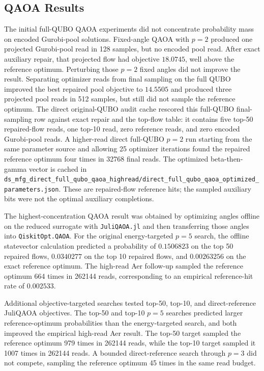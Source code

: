 \subsection{QAOA Results}
\label{subsec:ds-mfg-qaoa-results}

The initial full-QUBO QAOA experiments did not concentrate probability mass on
encoded Gurobi-pool solutions. Fixed-angle QAOA with $p=2$ produced one
projected Gurobi-pool read in 128 samples, but no encoded pool read. After
exact auxiliary repair, that projected flow had objective $18.0745$, well above
the reference optimum. Perturbing those $p=2$ fixed angles did not improve the
result. Separating optimizer reads from final sampling on the full QUBO improved
the best repaired pool objective to $14.5505$ and produced three projected pool
reads in 512 samples, but still did not sample the reference optimum.
The direct original-QUBO audit cache rescored this full-QUBO final-sampling row
against exact repair and the top-flow table: it contains five top-50
repaired-flow reads, one top-10 read, zero reference reads, and zero encoded
Gurobi-pool reads.
A higher-read direct full-QUBO $p=2$ run starting from the same parameter source
and allowing 25 optimizer iterations found the repaired reference optimum four
times in 32768 final reads. The optimized beta-then-gamma vector is cached in
\texttt{ds\_mfg\_direct\_full\_qubo\_qaoa\_highread/direct\_full\_qubo\_qaoa\_optimized\_parameters.json}.
These are repaired-flow reference hits; the sampled auxiliary bits were not the
optimal auxiliary completions.

The highest-concentration QAOA result was obtained by optimizing angles offline on the
reduced surrogate with \texttt{JuliQAOA.jl} and then transferring those angles
into \texttt{QiskitOpt.QAOA}. For the original energy-targeted $p=5$ search,
the offline statevector calculation
predicted a probability of $0.1506823$ on the top 50 repaired flows, $0.0340277$
on the top 10 repaired flows, and $0.00263256$ on the exact reference optimum. The
high-read Aer follow-up sampled the reference optimum 664 times in 262144 reads,
corresponding to an empirical reference-hit rate of $0.002533$.

Additional objective-targeted searches tested top-50, top-10, and direct-reference
JuliQAOA objectives. The top-50 and top-10 $p=5$ searches predicted larger
reference-optimum probabilities than the energy-targeted search, and both improved
the empirical high-read Aer result. The top-50 target sampled the reference optimum
979 times in 262144 reads, while the top-10 target sampled it 1007 times in
262144 reads. A bounded direct-reference search through $p=3$ did not compete,
sampling the reference optimum 45 times in the same read budget.

